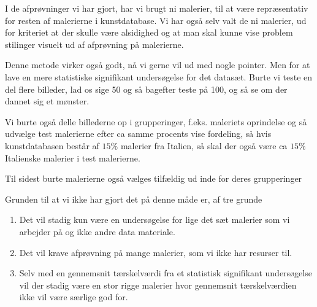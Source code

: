 I de afprøvninger vi har gjort, har vi brugt ni malerier, til at være
repræsentativ for resten af malerierne i kunstdatabase. Vi har også selv
valt de ni malerier, ud for kriteriet at der skulle være alsidighed og at
man skal kunne vise problem stilinger visuelt ud af afprøvning på
malerierne.

Denne metode virker også godt, nå vi gerne vil ud med nogle pointer.
Men for at lave en mere statistiske signifikant undersøgelse for det
datasæt. Burte vi teste en del flere billeder, lad os sige 50 og
så bagefter teste på 100, og så se om der dannet sig et mønster. 

Vi burte også delle billederne op i grupperinger, f.eks. maleriets
oprindelse og så udvælge test malerierne efter ca samme procents vise
fordeling, så hvis kunstdatabasen består af $15 \%$ malerier fra
Italien, så skal der også være ca $15 \%$ Italienske malerier i test
malerierne.

Til sidest burte malerierne også vælges tilfældig ud inde for deres
grupperinger

Grunden til at vi ikke har gjort det på denne måde er, af tre grunde

\begin{enumerate}
	\item Det vil stadig kun være en undersøgelse for lige det sæt
	malerier som vi arbejder på og ikke andre data materiale.
	\item Det vil krave afprøvning på mange malerier, som vi ikke har
	resurser til. 
	\item Selv med en gennemsnit tærskelværdi fra et statistisk
	signifikant undersøgelse vil der stadig være en stor rigge malerier
	hvor gennemsnit tærskelværdien ikke vil være særlige god for. 
\end{enumerate}
